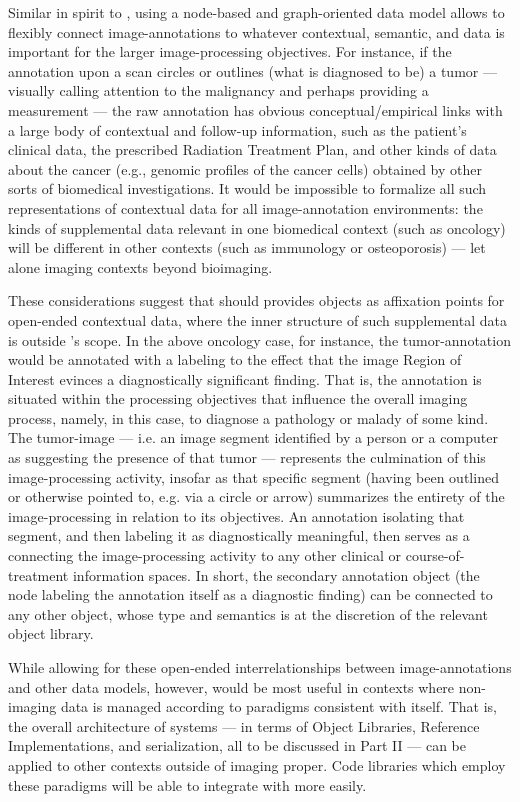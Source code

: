 {\begin{description}
Similar in spirit to \DICOMSR{}, using a node-based and 
graph-oriented data model allows \AXFI{} to 
flexibly connect image-annotations to 
whatever contextual, semantic, and  
data is important for the larger image-processing 
objectives.  For instance, if the annotation upon 
a \CT{} scan circles or outlines (what is 
diagnosed to be) a tumor --- visually 
calling attention to the malignancy and perhaps 
providing a measurement --- the raw annotation 
has obvious conceptual/empirical links with 
a large body of contextual and follow-up 
information, such as the patient's clinical 
data, the prescribed Radiation Treatment Plan, 
and other kinds of data about the cancer 
(e.g., genomic profiles of the cancer cells) 
obtained by other sorts of biomedical investigations.  
It would be impossible to formalize all 
such representations of contextual data for 
all image-annotation environments: the kinds 
of supplemental data relevant in one biomedical 
context (such as oncology) will be 
different in other contexts (such as 
immunology or osteoporosis) --- let alone 
imaging contexts beyond bioimaging.    
 
These considerations suggest that \AXFI{} 
should provides objects as affixation 
points for open-ended contextual 
data, where the inner structure of such 
supplemental data is outside \AXFI{}'s 
scope.  In the above oncology 
case, for instance, the tumor-annotation 
would be annotated with a labeling 
to the effect that the image Region of 
Interest evinces a diagnostically significant 
finding.  That is, the annotation is situated 
within the processing objectives that 
influence the overall imaging process, namely, 
in this case, to diagnose a pathology or 
malady of some kind.  The tumor-image --- 
i.e. an image segment identified by a person 
or a computer as suggesting the presence of that  
tumor --- represents the culmination of this 
image-processing activity, insofar as that 
specific segment (having been outlined or 
otherwise pointed to, e.g. via a circle or 
arrow) summarizes the entirety of the 
image-processing in relation to its 
objectives.  An annotation isolating that 
segment, and then labeling it as 
diagnostically meaningful, then serves as a 
 connecting the image-processing 
activity to any other clinical or course-of-treatment 
information spaces.  In short, the secondary 
annotation object (the node labeling the 
annotation itself as a diagnostic finding) 
can be connected to any other object, whose 
type and semantics is at the discretion 
of the relevant \AXFI{} object library.

While allowing for these open-ended interrelationships 
between image-annotations and other data models, 
however, \AXFI{} would be most useful in contexts 
where non-imaging data is managed according to paradigms 
consistent with \AXFI{} itself.   That is, the 
overall architecture of \AXFI{} systems --- in terms 
of \AXFI{} Object Libraries, Reference Implementations, 
and  serialization, all to be 
discussed in Part II --- can be applied to 
other contexts outside of imaging proper.  
Code libraries which employ these paradigms 
will be able to integrate with \AXFI{} more easily. 
\end{description}
}







